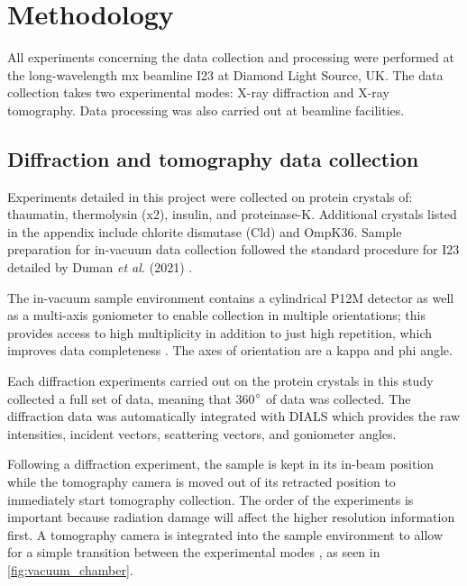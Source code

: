 \section{Methodology}\label{sec:methodology}

All experiments concerning the data collection and processing were performed at the long-wavelength \ac{mx} beamline I23 at Diamond Light Source, UK. The data collection takes two experimental modes: X-ray diffraction and X-ray tomography. Data processing was also carried out at beamline facilities. %

\subsection{Diffraction and tomography data collection}

Experiments detailed in this project were collected on protein crystals of: thaumatin, thermolysin (x2), insulin, and proteinase-K. Additional crystals listed in the appendix include chlorite dismutase (Cld) and OmpK36.
Sample preparation for in-vacuum data collection followed the standard procedure for I23 detailed by Duman \textit{et al.} (2021) \cite{Duman2021}.

The in-vacuum sample environment contains a cylindrical P12M detector as well as a multi-axis goniometer to enable collection  in multiple orientations; this provides access to high multiplicity in addition to just high repetition, which improves data completeness \cite{Finke2016}. The axes of orientation are a kappa and phi angle. %

Each diffraction experiments carried out on the protein crystals in this study collected a full set of data, meaning that 360$\degree$ of data was collected. The diffraction data was automatically integrated with DIALS \cite{Winter2018} which provides the raw intensities, incident vectors, scattering vectors, and goniometer angles.

Following a diffraction experiment, the sample is kept in its in-beam position while the tomography camera is moved out of its retracted position to immediately start tomography collection. The order of the experiments is important because radiation damage will affect the higher resolution information first. A tomography camera is integrated into the sample environment to allow for a simple transition between the experimental modes \cite{Kazantsev2021}, as seen in \cref{fig:vacuum_chamber}.

